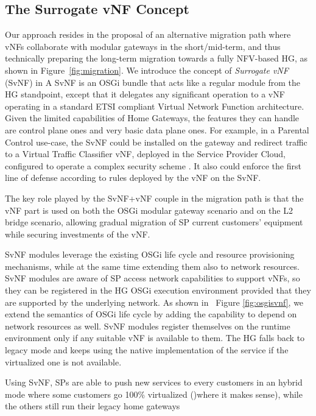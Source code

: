 \subsection{The Surrogate vNF Concept}

Our approach resides in the proposal of an alternative migration path where vNFs collaborate with modular gateways in the short/mid-term, and thus technically preparing the long-term migration towards a fully NFV-based HG, as shown in Figure~\ref{fig:migration}. We introduce the concept of \textit{Surrogate vNF} (SvNF) in  
A SvNF is an OSGi bundle that acts like a regular module from the HG standpoint, except that it delegates any significant operation to a vNF operating in a standard ETSI compliant Virtual Network Function architecture. 
Given the limited capabilities of Home Gateways, the features they can handle are control plane ones and very basic data plane ones.
For example, in a Parental Control use-case, the SvNF could be installed on the gateway and redirect traffic to a Virtual Traffic Classifier vNF, deployed in the Service Provider Cloud, configured to operate a complex security scheme \cite{basile_novel_2015}. It also could enforce the first line of defense according to rules deployed by the vNF on the SvNF.

The key role played by the SvNF+vNF couple in the migration path is that the vNF part is used on both the OSGi modular gateway scenario and on the L2 bridge scenario, allowing gradual migration of SP current customers' equipment while securing investments of the vNF. 

SvNF modules leverage the existing OSGi life cycle and resource provisioning mechanisms, while at the same time extending them also to network resources. SvNF modules are aware of SP access network capabilities to support vNFs, so they can be registered in the HG OSGi execution environment provided that they are supported by the underlying network.
As shown in ~Figure \ref{fig:osgisvnf}, we extend the semantics of OSGi life cycle by adding the capability to depend on network resources as well. SvNF modules register themselves on the runtime environment only if any suitable vNF is available to them. The HG falls back to legacy mode and keeps using the native implementation of the service if the virtualized one is not available.

Using SvNF, SPs are able to push new services to every customers in an hybrid mode where some customers go 100\% virtualized ()where it makes sense), while the others still run their legacy home gateways

